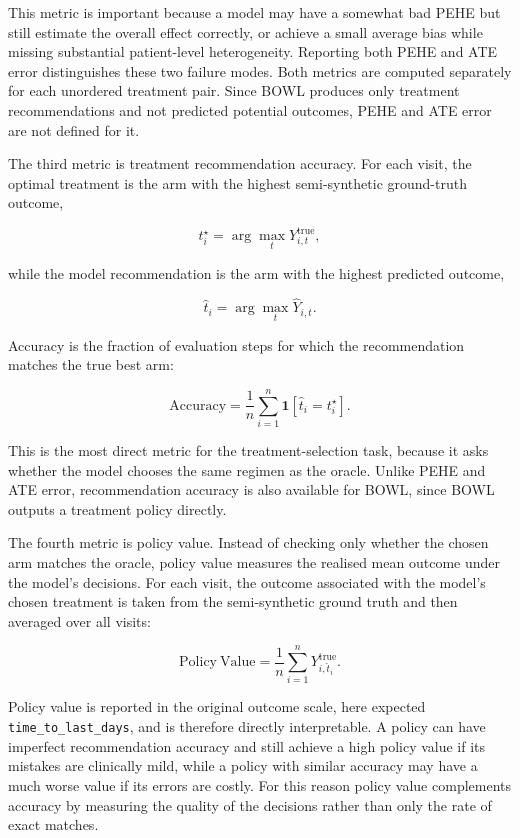 \documentclass{article}
\begin{document}
This metric is important because a model may have a somewhat bad PEHE but still estimate the overall effect correctly, or achieve a small average bias while missing substantial patient-level heterogeneity. Reporting both PEHE and ATE error distinguishes these two failure modes. Both metrics are computed separately for each unordered treatment pair. Since BOWL produces only treatment recommendations and not predicted potential outcomes, PEHE and ATE error are not defined for it.

The third metric is treatment recommendation accuracy. For each visit, the optimal treatment is the arm with the highest semi-synthetic ground-truth outcome,

\begin{equation}
    t_i^{\star} = \arg\max_t Y_{i,t}^{\text{true}},
\end{equation}

while the model recommendation is the arm with the highest predicted outcome,

\begin{equation}
    \hat{t}_i = \arg\max_t \hat{Y}_{i,t}.
\end{equation}

Accuracy is the fraction of evaluation steps for which the recommendation matches the true best arm:

\begin{equation}
    \mathrm{Accuracy} = \frac{1}{n} \sum_{i=1}^{n} \mathbf{1}\!\left[\hat{t}_i = t_i^{\star}\right].
\end{equation}

This is the most direct metric for the treatment-selection task, because it asks whether the model chooses the same regimen as the oracle. Unlike PEHE and ATE error, recommendation accuracy is also available for BOWL, since BOWL outputs a treatment policy directly.

The fourth metric is policy value. Instead of checking only whether the chosen arm matches the oracle, policy value measures the realised mean outcome under the model's decisions. For each visit, the outcome associated with the model's chosen treatment is taken from the semi-synthetic ground truth and then averaged over all visits:

\begin{equation}
    \mathrm{Policy\ Value} = \frac{1}{n} \sum_{i=1}^{n} Y_{i,\hat{t}_i}^{\text{true}}.
\end{equation}

Policy value is reported in the original outcome scale, here expected \texttt{time\_to\_last\_days}, and is therefore directly interpretable. A policy can have imperfect recommendation accuracy and still achieve a high policy value if its mistakes are clinically mild, while a policy with similar accuracy may have a much worse value if its errors are costly. For this reason policy value complements accuracy by measuring the quality of the decisions rather than only the rate of exact matches.
\end{document}
